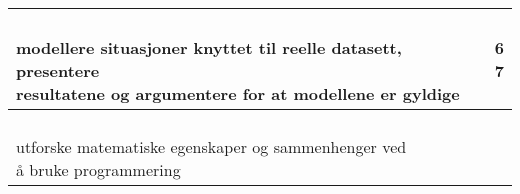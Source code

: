 \documentclass{article}
\begin{document}
\begin{center}
\begin{tabular}{p{10.5cm} | c | c |}
		\shortstack[l]{\\ modellere situasjoner knyttet til reelle datasett, presentere\\ resultatene og argumentere for at modellene er gyldige
		} &\shortstack{} &\shortstack{6\\7} \\ \hline
		
		\shortstack[l]{\\ utforske matematiske egenskaper og sammenhenger ved\\ å bruke programmering
		} &\shortstack{} &\shortstack{7} \\ \hline
		
	\end{tabular}	
\end{center}

\newpage
\end{document}
